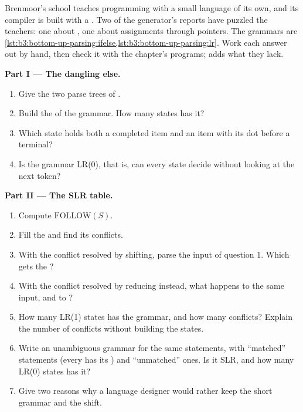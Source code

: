 \begin{problem}\label{pb:b3:bottom-up-parsing:1}
Brenmoor's school teaches programming with a small language of its own, and its compiler is built with a . Two of the generator's reports have puzzled the teachers: one about , one about assignments through pointers. The grammars are \cref{lst:b3:bottom-up-parsing:ifelse,lst:b3:bottom-up-parsing:lr}. Work each answer out by hand, then check it with the chapter's programs;  adds what they lack.

\medskip\noindent\textbf{Part I --- The dangling else.}
\begin{enumerate}
\item Give the two parse trees of .
\item Build the  of the  grammar. How many states has it?
\item Which state holds both a completed item and an item with its dot before a terminal?
\item Is the grammar LR(0), that is, can every state decide without looking at the next token?
\end{enumerate}

\medskip\noindent\textbf{Part II --- The SLR table.}
\begin{enumerate}[resume]
\item Compute $\mathrm{FOLLOW}(S)$.
\item Fill the  and find its conflicts.
\item With the conflict resolved by shifting, parse the input of question 1. Which  gets the ?
\item With the conflict resolved by reducing instead, what happens to the same input, and to ?
\item How many LR(1) states has the grammar, and how many conflicts? Explain the number of conflicts without building the states.
\item Write an unambiguous grammar for the same statements, with ``matched'' statements (every  has its ) and ``unmatched'' ones. Is it SLR, and how many LR(0) states has it?
\item Give two reasons why a language designer would rather keep the short grammar and the shift.
\end{enumerate}


\end{problem}
